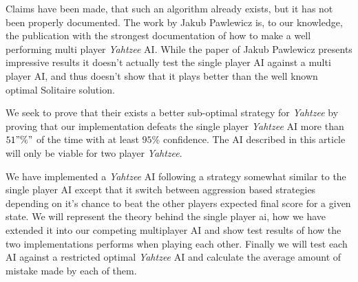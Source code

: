 Claims have been made, that such an algorithm already exists, but it has not been properly documented.
The work by Jakub Pawlewicz is, to our knowledge, the publication with the strongest documentation of how to make a well performing multi player \emph{Yahtzee} AI.
While the paper of Jakub Pawlewicz\citep{pawlewicz2011nearly} presents impressive results it doesn't actually test the single player AI against a multi player AI, and thus doesn't show that it plays better than the well known optimal Solitaire solution.

We seek to  prove that their exists a better sub-optimal strategy for \emph{Yahtzee} by proving that our implementation defeats the single player \emph{Yahtzee} AI more than $51"\%" $ of the time with at least $95\% $ confidence. The AI described in this article will only be viable for two player \emph{Yahtzee}.

We have implemented a \emph{Yahtzee} AI following a strategy somewhat similar to the single player AI except that it switch between aggression based strategies depending on it's chance to beat the other players expected final score for a given state. 
We will represent the theory behind the single player ai, how we have extended it into our competing multiplayer AI and show test results of how the two implementations performs when playing each other. 
Finally we will test each AI against a restricted optimal \emph{Yahtzee} AI and calculate the average amount of mistake made by each of them.

